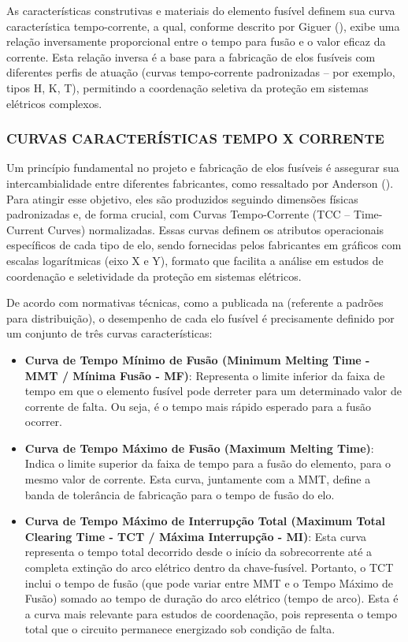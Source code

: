 \documentclass[oneside,openright,12pt]{ufsm_2021} %
\begin{document}
\par As características construtivas e materiais do elemento fusível definem sua curva característica tempo-corrente, a qual, conforme descrito por Giguer (\citeyear{giguer_protecao_1970}), exibe uma relação inversamente proporcional entre o tempo para fusão e o valor eficaz da corrente. Esta relação inversa é a base para a fabricação de elos fusíveis com diferentes perfis de atuação (curvas tempo-corrente padronizadas – por exemplo, tipos H, K, T), permitindo a coordenação seletiva da proteção em sistemas elétricos complexos.


\subsubsection{CURVAS CARACTERÍSTICAS TEMPO X CORRENTE}

\par Um princípio fundamental no projeto e fabricação de elos fusíveis é assegurar sua intercambialidade entre diferentes fabricantes, como ressaltado por Anderson (\citeyear{anderson_power_1999}). Para atingir esse objetivo, eles são produzidos seguindo dimensões físicas padronizadas e, de forma crucial, com Curvas Tempo-Corrente (TCC – Time-Current Curves) normalizadas. Essas curvas definem os atributos operacionais específicos de cada tipo de elo, sendo fornecidas pelos fabricantes em gráficos com escalas logarítmicas (eixo X e Y), formato que facilita a análise em estudos de coordenação e seletividade da proteção em sistemas elétricos.

\par De acordo com normativas técnicas, como a publicada na \cite{ieee_pc3741d7_2024} (referente a padrões para distribuição), o desempenho de cada elo fusível é precisamente definido por um conjunto de três curvas características:
\begin{itemize}
	\item \textbf{Curva de Tempo Mínimo de Fusão (Minimum Melting Time - MMT / Mínima Fusão - MF)}: Representa o limite inferior da faixa de tempo em que o elemento fusível pode derreter para um determinado valor de corrente de falta. Ou seja, é o tempo mais rápido esperado para a fusão ocorrer.
	\item \textbf{Curva de Tempo Máximo de Fusão (Maximum Melting Time)}: Indica o limite superior da faixa de tempo para a fusão do elemento, para o mesmo valor de corrente. Esta curva, juntamente com a MMT, define a banda de tolerância de fabricação para o tempo de fusão do elo.
	\item \textbf{Curva de Tempo Máximo de Interrupção Total (Maximum Total Clearing Time - TCT / Máxima Interrupção - MI)}: Esta curva representa o tempo total decorrido desde o início da sobrecorrente até a completa extinção do arco elétrico dentro da chave-fusível. Portanto, o TCT inclui o tempo de fusão (que pode variar entre MMT e o Tempo Máximo de Fusão) somado ao tempo de duração do arco elétrico (tempo de arco). Esta é a curva mais relevante para estudos de coordenação, pois representa o tempo total que o circuito permanece energizado sob condição de falta.
\end{itemize}
\end{document}
